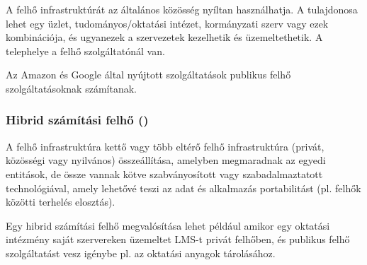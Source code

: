 A felhő infrastruktúrát az általános közösség nyíltan használhatja. A tulajdonosa lehet egy üzlet, tudományos/oktatási intézet, kormányzati szerv vagy ezek kombinációja, és ugyanezek a szervezetek kezelhetik és üzemeltethetik. A telephelye a felhő szolgáltatónál van.

Az Amazon és Google által nyújtott szolgáltatások publikus felhő szolgáltatásoknak számítanak.

\subsubsection{Hibrid számítási felhő ()}

A felhő infrastruktúra kettő vagy több eltérő felhő infrastruktúra (privát, közösségi vagy nyilvános) összeállítása, amelyben megmaradnak az egyedi entitások, de össze vannak kötve szabványosított vagy szabadalmaztatott technológiával, amely lehetővé teszi az adat és alkalmazás portabilitást (pl. felhők közötti terhelés elosztás).

Egy hibrid számítási felhő megvalósítása lehet például amikor egy oktatási intézmény saját szervereken üzemeltet LMS-t privát felhőben, és publikus felhő szolgáltatást vesz igénybe pl. az oktatási anyagok tárolásához.

